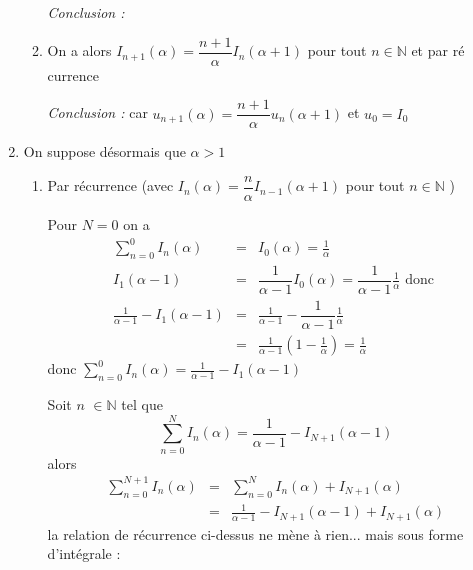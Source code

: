 \documentclass[a4paper, 11pt,reqno]{article}
\begin{document}
\begin{enumerate}
\begin{enumerate}
\textsl{Conclusion : }

\item On a alors $I_{n+1}\left( \alpha \right) =\dfrac{n+1}{\alpha }%
I_{n}\left( \alpha +1\right) $ pour tout $n\in \mathbb{N}$ et par r\'{e}%
currence 

\textsl{Conclusion : } car $u_{n+1}\left( \alpha \right) =\dfrac{n+1}{\alpha }%
u_{n}\left( \alpha +1\right) $ et $u_{0}=I_{0}$
\end{enumerate}

\item On suppose d\'{e}sormais que $\alpha >1$

\begin{enumerate}
\item Par r\'{e}currence (avec $I_{n}\left( \alpha \right) =\dfrac{n}{\alpha 
}I_{n-1}\left( \alpha +1\right) $  pour tout $n\in \mathbb{N}$ )

Pour $N=0$ on a 
\begin{eqnarray*}
\sum_{n=0}^{0}I_{n}\left( \alpha \right)  &=&I_{0}\left( \alpha \right) =%
\frac{1}{\alpha } \\
I_{1}\left( \alpha -1\right)  &=&\dfrac{1}{\alpha -1}I_{0}\left( \alpha
\right) =\dfrac{1}{\alpha -1}\frac{1}{\alpha }\text{ donc } \\
\frac{1}{\alpha -1}-I_{1}\left( \alpha -1\right)  &=&\frac{1}{\alpha -1}-%
\dfrac{1}{\alpha -1}\frac{1}{\alpha } \\
&=&\frac{1}{\alpha -1}\left( 1-\frac{1}{\alpha }\right) =\frac{1}{\alpha }
\end{eqnarray*}
donc $\displaystyle\sum_{n=0}^{0}I_{n}\left( \alpha \right) =\frac{1}{\alpha
-1}-I_{1}\left( \alpha -1\right) $

Soit $n$ $\in \mathbb{N}$ tel que 
\begin{equation*}
\sum_{n=0}^{N}I_{n}\left( \alpha \right) =\frac{1}{\alpha -1}-I_{N+1}\left(
\alpha -1\right) 
\end{equation*}%
alors 
\begin{eqnarray*}
\sum_{n=0}^{N+1}I_{n}\left( \alpha \right)  &=&\sum_{n=0}^{N}I_{n}\left(
\alpha \right) +I_{N+1}\left( \alpha \right)  \\
&=&\frac{1}{\alpha -1}-I_{N+1}\left( \alpha -1\right) +I_{N+1}\left( \alpha
\right) 
\end{eqnarray*}%
la relation de r\'{e}currence ci-dessus ne m\`{e}ne \`{a} rien... mais sous
forme d'int\'{e}grale :


\end{enumerate}
\end{enumerate}
\end{document}
